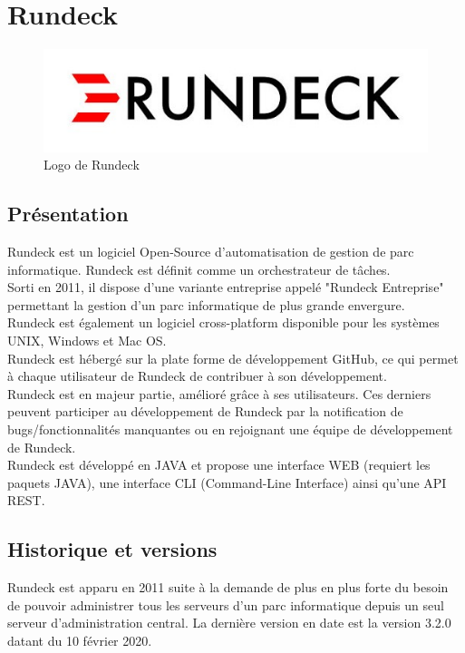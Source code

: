 \documentclass[12pt]{article}
\begin{document}
\section{Rundeck}

\begin{figure}[ht]
    \includegraphics[scale=0.8]{images/rundeck.jpg}
    \caption{Logo de Rundeck}
\end{figure}

\subsection{Présentation}

Rundeck est un logiciel Open-Source d'automatisation de gestion de parc informatique. Rundeck est définit comme un orchestrateur de tâches. 
\\
Sorti en 2011, il dispose d'une variante entreprise appelé "Rundeck Entreprise" permettant la gestion d'un parc informatique de plus grande envergure. 
\\
Rundeck est également un logiciel cross-platform disponible pour les systèmes UNIX, Windows et Mac OS. 
\\
Rundeck est hébergé sur la plate forme de développement GitHub, ce qui permet à chaque utilisateur de Rundeck de contribuer à son développement. 
\\
Rundeck est en majeur partie, amélioré grâce à ses utilisateurs. Ces derniers peuvent participer au développement de Rundeck par la notification de bugs/fonctionnalités manquantes ou en rejoignant une équipe de développement de Rundeck. 
\\
Rundeck est développé en JAVA et propose une interface WEB (requiert les paquets JAVA), une interface CLI (Command-Line Interface) ainsi qu'une API REST.

\subsection{Historique et versions}

Rundeck est apparu en 2011 suite à la demande de plus en plus forte du besoin de pouvoir administrer tous les serveurs d'un parc informatique depuis un seul serveur d'administration central. La dernière version en date est la version 3.2.0 datant du 10 février 2020.
\end{document}

